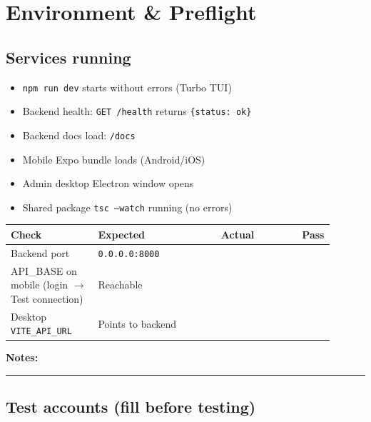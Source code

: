 \documentclass[11pt,a4paper,oneside]{article}
\newcommand{\chk}{\fbox{\rule{0pt}{1.05ex}\rule{1.05ex}{0pt}}}
\newcommand{\fillinlong}{\rule{0.72\textwidth}{0.4pt}}
\newcommand{\notesblock}{\par\smallskip\noindent\textbf{Notes:}\ \fillinlong\par\smallskip}
\begin{document}
\section{Environment \& Preflight}

\subsection{Services running}

\begin{itemize}[leftmargin=2em, itemsep=0.25em]
  \item[\chk] \texttt{npm run dev} starts without errors (Turbo TUI)
  \item[\chk] Backend health: \texttt{GET /health} returns \texttt{\{status: ok\}}
  \item[\chk] Backend docs load: \texttt{/docs}
  \item[\chk] Mobile Expo bundle loads (Android/iOS)
  \item[\chk] Admin desktop Electron window opens
  \item[\chk] Shared package \texttt{tsc --watch} running (no errors)
\end{itemize}

\small
\begin{tabular}{@{}>{\raggedright\arraybackslash}p{0.27\linewidth} >{\raggedright\arraybackslash}p{0.38\linewidth} >{\raggedright\arraybackslash}p{0.25\linewidth} c@{}}
  \toprule
  \textbf{Check} & \textbf{Expected} & \textbf{Actual} & \textbf{Pass} \\
  \midrule
  Backend port & \texttt{0.0.0.0:8000} & & \chk \\
  API\_BASE on mobile (login $\rightarrow$ Test connection) & Reachable & & \chk \\
  Desktop \texttt{VITE\_API\_URL} & Points to backend & & \chk \\
  \bottomrule
\end{tabular}
\normalsize

\notesblock

\subsection{Test accounts (fill before testing)}
\end{document}
